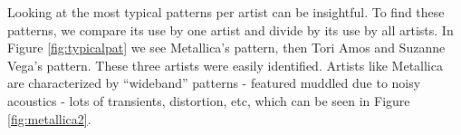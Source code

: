 \documentclass{article}
\begin{document}
Looking at the most typical patterns per artist can be insightful.
To find these patterns, we compare its use by one artist and divide
by its use by all artists. In Figure \ref{fig:typicalpat} we see 
Metallica's pattern, then Tori Amos and
Suzanne Vega's pattern. These three artists were easily identified.
Artists like Metallica are characterized by ``wideband'' patterns -
featured muddled due to noisy acoustics - lots of transients,
distortion, etc, which can be seen in Figure \ref{fig:metallica2}.

\end{document}
